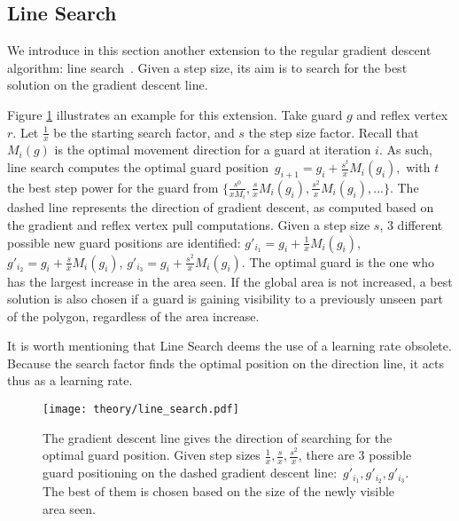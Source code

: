 \newpage
\subsection{Line Search}
\label{sec:line_search}
We introduce in this section another extension to the regular gradient descent algorithm: line search~\cite{swann1969survey}. Given a step size, its aim is to search for the best solution on the gradient descent line. 

Figure \ref{fig:line} illustrates an example for this extension. Take guard $g$ and reflex vertex $r$. Let $\frac 1 x$ be the starting search factor, and $s$ the step size factor. Recall that $M_i(g)$ is the optimal movement direction for a guard at iteration $i$. As such, line search  computes the optimal guard position~$g_{i + 1} = g_i + \frac{s^t}{x}M_i(g_i),$ with $t$ the best step power for the guard from $\{\frac{s^0}{xM_i}, \frac{s}{x}M_i(g_i), \frac{s^2}{x}M_i(g_i), ...\}$. The dashed line represents the direction of gradient descent, as computed based on the gradient and reflex vertex pull computations. Given a step size $s$, 3 different possible new guard positions are identified: $g'_{i_1} = g_i + \frac 1 xM_i(g_i)$,  $g'_{i_2} = g_i + \frac s x M_i(g_i)$, $g'_{i_3} = g_i + \frac{s^2}{x} M_i(g_i)$.
The optimal guard is the one who has the largest increase in the area seen. If the global area is not increased, a best solution is also chosen if a guard is gaining visibility to a previously unseen part of the polygon, regardless of the area increase.

It is worth mentioning that Line Search deems the use of a learning rate obsolete. Because the search factor finds the optimal position on the direction line, it acts thus as a learning rate.

\begin{figure}[h!]
    \centering
    \texttt{[image: theory/line\_search.pdf]}
    \caption{The gradient descent line gives the direction of searching for the optimal guard position. Given step sizes $\frac 1 x, \frac s x, \frac{s^2}{x}$, there are 3 possible guard positioning on the dashed gradient descent line:~$g'_{i_1}, g'_{i_2}, g'_{i_3}$. The best of them is chosen based on the size of the newly visible area seen.}
    \label{fig:line}
\end{figure}


